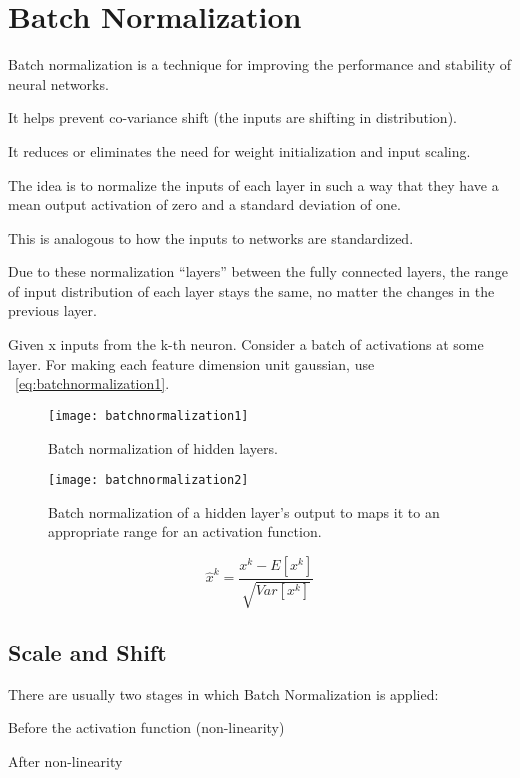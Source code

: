 	\section{Batch Normalization}

	\begin{bulletedlist}
		\item Batch normalization is a technique for improving the performance and stability of neural networks.
		\item It helps prevent co-variance shift (the inputs are shifting in distribution).
		\item It reduces or eliminates the need for weight initialization and input scaling.
		\item The idea is to normalize the inputs of each layer in such a way that they have a mean output activation of zero and a standard deviation of one.
		\item This is analogous to how the inputs to networks are standardized.
		\item Due to these normalization ``layers'' between the fully connected layers, the range of input distribution of each layer stays the same, no matter the changes in the previous layer.
		\item Given x inputs from the k-th neuron. Consider a batch of activations at some layer. For making each feature dimension unit gaussian, use \equationname~\ref{eq:batchnormalization1}.
	\end{bulletedlist}

 	\begin{figure}[htb]
		\centering
		\texttt{[image: batchnormalization1]}
		\caption[Batch normalization of hidden layers]{Batch normalization of hidden layers.}
		\label{fig:batchnormalization1}
	\end{figure}
 	\begin{figure}[htb]
		\centering
		\texttt{[image: batchnormalization2]}
		\caption[Batch normalization and activation functions]{Batch normalization of a hidden layer's output to maps it to an appropriate range for an activation function.}
		\label{fig:batchnormalization2}
	\end{figure}

	\begin{equation}
		\hat{x}^k = \frac{x^k - E\left[x^k \right]}{\sqrt{Var\left[x^k \right]}}
		\label{eq:batchnormalization1}
	\end{equation}

	\subsection{Scale and Shift}
There are usually two stages in which Batch Normalization is applied:
	\begin{numberedlist}
		\item Before the activation function (non-linearity)
		\item After non-linearity
	\end{numberedlist}

